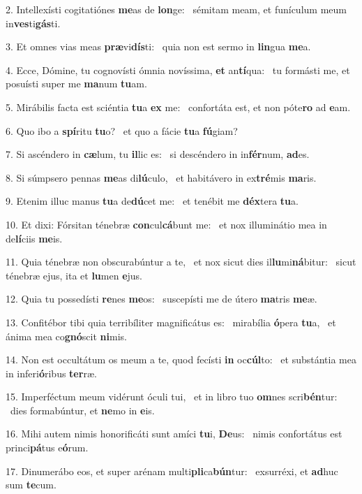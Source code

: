 2. Intellexísti cogitatiónes \textbf{me}as de \textbf{lon}ge: \ast\  sémitam meam, et funículum meum in\textbf{ves}ti\textbf{gás}ti.\

3. Et omnes vias meas \textbf{præ}vi\textbf{dís}ti: \ast\  quia non est sermo in \textbf{lin}gua \textbf{me}a.\

4. Ecce, Dómine, tu cognovísti ómnia novíssima, \textbf{et} an\textbf{tí}qua: \ast\  tu formásti me, et posuísti super me \textbf{ma}num \textbf{tu}am.\

5. Mirábilis facta est sciéntia \textbf{tu}a \textbf{ex} me: \ast\  confortáta est, et non póte\textbf{ro} ad \textbf{e}am.\

6. Quo ibo a \textbf{spí}ritu \textbf{tu}o? \ast\  et quo a fácie \textbf{tu}a \textbf{fú}giam?\

7. Si ascéndero in \textbf{cæ}lum, tu \textbf{il}lic es: \ast\  si descéndero in in\textbf{fér}num, \textbf{ad}es.\

8. Si súmpsero pennas \textbf{me}as di\textbf{lú}culo, \ast\  et habitávero in ex\textbf{tré}mis \textbf{ma}ris.\

9. Etenim illuc manus \textbf{tu}a de\textbf{dú}cet me: \ast\  et tenébit me \textbf{déx}tera \textbf{tu}a.\

10. Et dixi: Fórsitan ténebræ \textbf{con}cul\textbf{cá}bunt me: \ast\  et nox illuminátio mea in de\textbf{lí}ciis \textbf{me}is.\

11. Quia ténebræ non obscurabúntur a te, \dag\  et nox sicut dies il\textbf{lu}mi\textbf{ná}bitur: \ast\  sicut ténebræ ejus, ita et \textbf{lu}men \textbf{e}jus.\

12. Quia tu possedísti \textbf{re}nes \textbf{me}os: \ast\  suscepísti me de útero \textbf{ma}tris \textbf{me}æ.\

13. Confitébor tibi quia terribíliter magnificátus es: \dag\  mirabília \textbf{ó}pera \textbf{tu}a, \ast\  et ánima mea co\textbf{gnó}scit \textbf{ni}mis.\

14. Non est occultátum os meum a te, quod fecísti \textbf{in} oc\textbf{cúl}to: \ast\  et substántia mea in inferi\textbf{ó}ribus \textbf{ter}ræ.\

15. Imperféctum meum vidérunt óculi tui, \dag\  et in libro tuo \textbf{om}nes scri\textbf{bén}tur: \ast\  dies formabúntur, et \textbf{ne}mo in \textbf{e}is.\

16. Mihi autem nimis honorificáti sunt amíci \textbf{tu}i, \textbf{De}us: \ast\  nimis confortátus est princi\textbf{pá}tus e\textbf{ó}rum.\

17. Dinumerábo eos, et super arénam multi\textbf{pli}ca\textbf{bún}tur: \ast\  exsurréxi, et \textbf{ad}huc sum \textbf{te}cum.\

